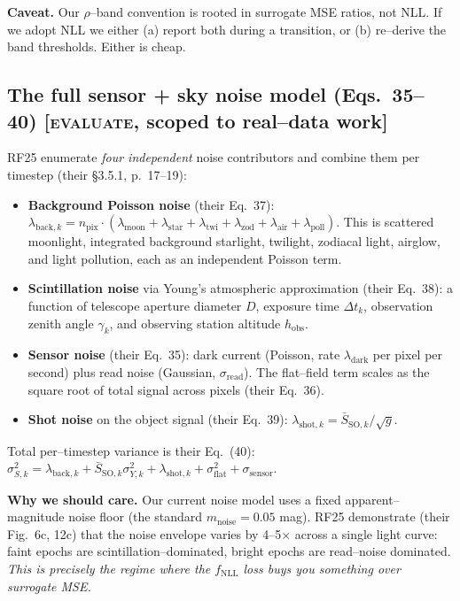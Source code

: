 \documentclass[11pt]{article}
\newcommand{\NLL}{f_{\mathrm{NLL}}}
\begin{document}
\textbf{Caveat.} Our $\rho$--band convention is rooted in surrogate MSE
ratios, not NLL. If we adopt NLL we either (a) report both during a
transition, or (b) re--derive the band thresholds. Either is cheap.

\subsection{The full sensor + sky noise model (Eqs.~35--40) \textnormal{[\textsc{evaluate}, scoped to real--data work]}}
\label{ssec:noise}

\noindent
RF25 enumerate \emph{four independent} noise contributors and combine them per
timestep (their \S3.5.1, p.~17--19):

\begin{itemize}
\item \textbf{Background Poisson noise} (their Eq.~37):
$\lambda_{\mathrm{back},k} = n_{\mathrm{pix}} \cdot
(\lambda_{\mathrm{moon}} + \lambda_{\mathrm{star}} + \lambda_{\mathrm{twi}}
+ \lambda_{\mathrm{zod}} + \lambda_{\mathrm{air}} + \lambda_{\mathrm{poll}})$.
This is scattered moonlight, integrated background starlight, twilight,
zodiacal light, airglow, and light pollution, each as an independent
Poisson term.
\item \textbf{Scintillation noise} via Young's atmospheric approximation
(their Eq.~38): a function of telescope aperture diameter $D$, exposure
time $\Delta t_k$, observation zenith angle $\gamma_k$, and observing
station altitude $h_{\mathrm{obs}}$.
\item \textbf{Sensor noise} (their Eq.~35): dark current (Poisson, rate
$\lambda_{\mathrm{dark}}$ per pixel per second) plus read noise
(Gaussian, $\sigma_{\mathrm{read}}$). The flat--field term scales as the
square root of total signal across pixels (their Eq.~36).
\item \textbf{Shot noise} on the object signal (their Eq.~39):
$\lambda_{\mathrm{shot},k} = \bar{S}_{\mathrm{SO},k} / \sqrt{g}$.
\end{itemize}

\noindent
Total per--timestep variance is their Eq.~(40):
$\sigma_{S,k}^2 = \lambda_{\mathrm{back},k}
+ \bar{S}_{\mathrm{SO},k} \sigma_{Y,k}^2
+ \lambda_{\mathrm{shot},k} + \sigma_{\mathrm{flat}}^2 + \sigma_{\mathrm{sensor}}$.

\textbf{Why we should care.} Our current noise model uses a fixed apparent--magnitude
noise floor (the standard $m_{\mathrm{noise}} = 0.05$ mag). RF25 demonstrate
(their Fig.~6c, 12c) that the noise envelope varies by 4--5$\times$ across a
single light curve: faint epochs are scintillation--dominated, bright epochs
are read--noise dominated. \emph{This is precisely the regime where the
$\NLL$ loss buys you something over surrogate MSE.}
\end{document}
